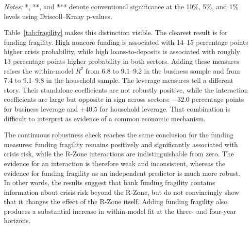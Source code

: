 \documentclass[11pt]{article}
\begin{document}
\begin{table}[H]
\centering
\caption{\textbf{Three-year bank-fragility extension.} High fragility and
interaction coefficients are percentage points; $R^2_0$ and $R^2_1$ refer to
the same-sample GHSS and extended models. The table's main lesson is that
noncore funding and loans-to-deposits add standalone information, while the
interaction effect is too measure- and sector-sensitive to support a single
amplification mechanism.}
\label{tab:fragility}
\small


\medskip
\footnotesize
\textit{Notes:} *, **, and *** denote conventional significance at the 10\%,
5\%, and 1\% levels using Driscoll--Kraay p-values.
\end{table}

Table~\ref{tab:fragility} makes this distinction visible. The clearest
result is for funding fragility. High noncore funding is associated with
14--15 percentage points higher crisis probability, while high
loans-to-deposits is associated with roughly 13 percentage points higher
probability in both sectors. Adding these measures raises the within-model
$R^2$ from 6.8 to 9.1--9.2 in the business sample and from 7.4 to 9.1--9.8
in the household sample. The leverage measures tell a different story. Their
standalone coefficients are not robustly positive, while the interaction
coefficients are large but opposite in sign across sectors: $-32.0$
percentage points for business leverage and $+40.5$ for household leverage.
That combination is difficult to interpret as evidence of a common economic
mechanism.

The continuous robustness check reaches the same conclusion for the funding
measures: funding fragility remains positively and significantly associated
with crisis risk, while the R-Zone interactions are indistinguishable from
zero. The evidence for an interaction is therefore weak and inconsistent,
whereas the evidence for funding fragility as an independent predictor is
much more robust. In other words, the results suggest that bank funding
fragility contains information about crisis risk beyond the R-Zone, but do
not convincingly show that it changes the effect of the R-Zone itself.
Adding funding fragility also produces a substantial increase in
within-model fit at the three- and four-year horizons.
\end{document}
